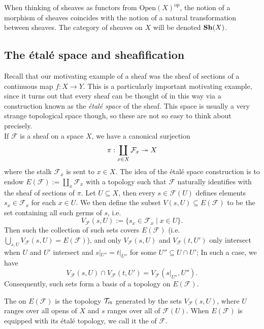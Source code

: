 When thinking of sheaves as functors from $\mathrm{Open}(X)^\text{op}$, the notion of a morphism of sheaves coincides with the notion of a natural transformation between sheaves. The category of sheaves on $X$ will be denoted $\mathbf{Sh}(X)$.

\subsection{The \'etal\'e space and sheafification}
\label{subsec:A_1_etale_space}
Recall that our motivating example of a sheaf was the sheaf of sections of a continuous map $f: X \to Y$. This is a particularly important motivating example, since it turns out that every sheaf can be thought of in this way via a construction known as the \emph{\'etal\'e space} of the sheaf. This space is usually a very strange topological space though, so these are not so easy to think about precisely.\\

If $\mathcal{F}$ is a sheaf on a space $X$, we have a canonical surjection
\[
	\pi : \coprod_{x \in X} \mathcal{F}_x \twoheadrightarrow X
\]
where the stalk $\mathcal{F}_x$ is sent to $x \in X$. The idea of the \'etal\'e space construction is to endow $E(\mathcal{F}) := \coprod_x \mathcal{F}_x$ with a topology such that $\mathcal{F}$ naturally identifies with the sheaf of sections of $\pi$. Let $U \subseteq X$, then every $s \in \mathcal{F}(U)$ defines elements $s_x \in \mathcal{F}_x$ for each $x \in U$. We then define the subset $V(s, U) \subseteq E(\mathcal{F})$ to be the set containing all such germs of $s$, i.e. 
\[
	V_{\mathcal{F}}(s, U) := \{ s_x \in \mathcal{F}_x \mid x \in U \}.
\]
Then such the collection of such sets covers $E(\mathcal{F})$ (i.e. $\bigcup_{s,U} V_{\mathcal{F}}(s,U) = E(\mathcal{F})$), and only $V_{\mathcal{F}}(s,U)$ and $V_{\mathcal{F}}(t, U')$ only intersect when $U$ and $U'$ intersect and $s|_{U''} = t|_{U''}$ for some $U'' \subseteq U \cap U'$; In such a case, we have
\[
	V_\mathcal{F}(s,U) \cap V_{\mathcal{F}}(t, U') = V_{\mathcal{F}}(s|_{U''}, U'').
\]
Consequently, such sets form a basis of a topology on $E(\mathcal{F})$.

\begin{defn}
	The  on $E(\mathcal{F})$ is the topology $\mathcal{T}_{\mathrm{\acute{e}t}}$ generated by the sets $V_{\mathcal{F}}(s, U)$, where $U$ ranges over all opens of $X$ and $s$ ranges over all of $\mathcal{F}(U)$. When $E(\mathcal{F})$ is equipped with its \'etal\'e topology, we call it the  of $\mathcal{F}$.
\end{defn}

